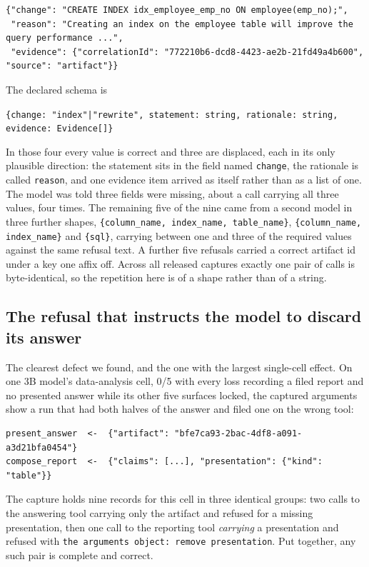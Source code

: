 \documentclass[11pt]{article}
\newcommand{\code}[1]{\texttt{\small #1}}
\begin{document}
\begin{lstlisting}
{"change": "CREATE INDEX idx_employee_emp_no ON employee(emp_no);",
 "reason": "Creating an index on the employee table will improve the query performance ...",
 "evidence": {"correlationId": "772210b6-dcd8-4423-ae2b-21fd49a4b600", "source": "artifact"}}
\end{lstlisting}

The declared schema is

\begin{center}
\code{\{change: "index"|"rewrite", statement: string, rationale: string, evidence: Evidence[]\}}
\end{center}

\noindent In those four every value is correct and three are displaced, each in its only plausible
direction: the statement sits in the field named \code{change}, the rationale is called \code{reason}, and one
evidence item arrived as itself rather than as a list of one. The model was told three fields were missing,
about a call carrying all three values, four times. The remaining five of the nine came from a second model in
three further shapes, \code{\{column\_name, index\_name, table\_name\}}, \code{\{column\_name,
index\_name\}} and \code{\{sql\}}, carrying between one and three of the required values against the same
refusal text. A further five refusals carried a correct artifact id under a key one affix off. Across all
released captures exactly one pair of calls is byte-identical, so the repetition here is of a shape rather than
of a string.

\subsection{The refusal that instructs the model to discard its answer}
\label{sec:remove}

The clearest defect we found, and the one with the largest single-cell effect. On one 3B model's data-analysis
cell, 0/5 with every loss recording a filed report and no presented answer while its other five surfaces locked,
the captured arguments show a run that had both halves of the answer and filed one on the wrong tool:

\begin{lstlisting}
present_answer  <-  {"artifact": "bfe7ca93-2bac-4df8-a091-a3d21bfa0454"}
compose_report  <-  {"claims": [...], "presentation": {"kind": "table"}}
\end{lstlisting}

The capture holds nine records for this cell in three identical groups: two calls to the answering tool carrying
only the artifact and refused for a missing presentation, then one call to the reporting tool \emph{carrying} a
presentation and refused with \code{the arguments object: remove presentation}. Put together, any such pair is
complete and correct.
\end{document}
